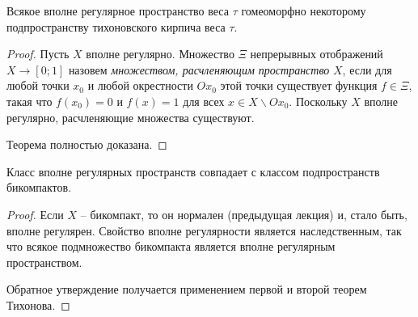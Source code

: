 \begin{theorem}
    Всякое вполне регулярное пространство веса $\tau$ гомеоморфно некоторому подпространству тихоновского кирпича веса $\tau$.
\end{theorem}

\begin{proof}
Пусть $X$ вполне регулярно. Множество $\Xi$ непрерывных отображений $X\rightarrow [0;1]$ назовем \emph{множеством, расчленяющим пространство} $X$, если для любой точки
$x_0$  и любой окрестности $Ox_0$ этой точки существует функция $f\in\Xi$, такая что $f(x_0) = 0$ и $f(x) = 1$ для всех $x\in X\backslash Ox_0$. Поскольку $X$ вполне
регулярно, расчленяющие множества существуют.

Теорема полностью доказана.
\end{proof}

\begin{corollary}
Класс вполне регулярных пространств совпадает с классом подпространств бикомпактов.
\end{corollary}

\begin{proof}
Если $X$ -- бикомпакт, то он нормален (предыдущая лекция) и, стало быть, вполне регулярен. Свойство вполне регулярности является наследственным, так что всякое подмножество
бикомпакта является вполне регулярным пространством.

Обратное утверждение получается применением первой и второй теорем Тихонова.
\end{proof}